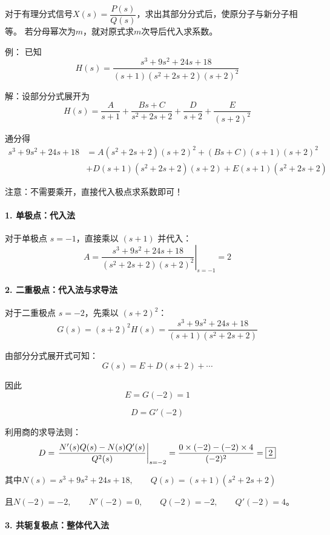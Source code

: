 \documentclass[UTF8,fontset=fandol,zihao=5]{ctexart}
\begin{document}
\begin{methodbox}[【技巧】Laplace反变换]
  对于有理分式信号$X(s)=\dfrac{P(s)}{Q(s)}$，求出其部分分式后，使原分子与新分子相等。
  若分母幂次为$m$，就对原式求$m$次导后代入求系数。
  
  例：
  已知
  \[
  H(s)=\frac{s^3+9s^2+24s+18}
  {(s+1)(s^2+2s+2)(s+2)^2}
  \]

  解：设部分分式展开为
  \[
  H(s)=\frac{A}{s+1}
  +\frac{Bs+C}{s^2+2s+2}
  +\frac{D}{s+2}
  +\frac{E}{(s+2)^2}
  \]

  通分得
  \[
  \begin{aligned}
  s^3+9s^2+24s+18&=A(s^2+2s+2)(s+2)^2+(Bs+C)(s+1)(s+2)^2\\
  &+D(s+1)(s^2+2s+2)(s+2)+E(s+1)(s^2+2s+2)
  \end{aligned}
  \]

  注意：不需要乘开，直接代入极点求系数即可！

  \paragraph{1. 单极点：代入法}

  对于单极点 $s=-1$，直接乘以 $(s+1)$ 并代入：
  \[
  A=\left.
  \frac{s^3+9s^2+24s+18}
  {(s^2+2s+2)(s+2)^2}
  \right|_{s=-1}=\boxed{2}
  \]

  \paragraph{2. 二重极点：代入法与求导法}

  对于二重极点 $s=-2$，先乘以 $(s+2)^2$：
  \[
  G(s)=(s+2)^2H(s)
  =\frac{s^3+9s^2+24s+18}
  {(s+1)(s^2+2s+2)}
  \]

  由部分分式展开式可知：
  \[
  G(s)=E+D(s+2)+\cdots
  \]

  因此
  \[
  E=G(-2)=\boxed{1}
  \]

  \[
  D=G'(-2)
  \]

  利用商的求导法则：
  \[
  D=\left.
  \frac{N'(s)Q(s)-N(s)Q'(s)}
  {Q^2(s)}
  \right|_{s=-2}=\frac{0\times(-2)-(-2)\times4}{(-2)^2}\\=\boxed{2}
  \]

  其中$N(s)=s^3+9s^2+24s+18,\qquad Q(s)=(s+1)(s^2+2s+2)$

  且$N(-2)=-2,\qquad N'(-2)=0,\qquad Q(-2)=-2,\qquad Q'(-2)=4$。

  \paragraph{3. 共轭复极点：整体代入法}


\end{methodbox}
\end{document}
